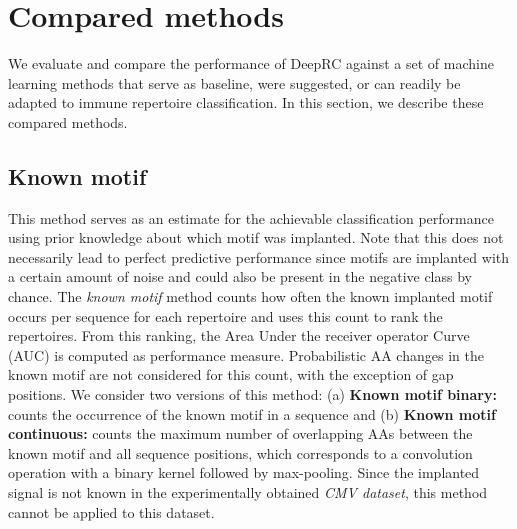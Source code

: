 \documentclass[oneside]{book}
\begin{document}
%




%

\clearpage
\section{Compared methods}\label{subsec:methods_compared}
We evaluate and compare the performance of 
DeepRC against a set of machine learning methods that
serve as baseline, were suggested, or 
can readily be adapted to immune repertoire 
classification. In this section, we describe these compared 
methods.

%
\subsection{Known motif}
%
This method serves as an estimate for the achievable classification performance 
using prior knowledge about which motif was implanted. 
Note that this does not necessarily lead to perfect predictive performance
since motifs are implanted with a certain amount of noise
and could also be present in the negative class by chance.
The \emph{known motif} method counts how often the known implanted motif occurs 
per sequence for each repertoire and uses this count to rank the repertoires.
From this ranking, 
the Area Under the receiver operator Curve (AUC) is computed as performance measure.
Probabilistic AA changes in the known motif are not considered for this count,
with the exception of gap positions.
We consider two versions of this method:
(a) \textbf{Known motif binary:} counts the occurrence of the known motif in a sequence
and (b) \textbf{Known motif continuous:} counts the maximum number of overlapping AAs between the 
known motif and all sequence positions,
which corresponds to a convolution operation with a binary kernel followed by max-pooling.
Since the implanted signal is not known in the experimentally obtained \emph{CMV dataset},
this method cannot be applied to this dataset.
\end{document}
